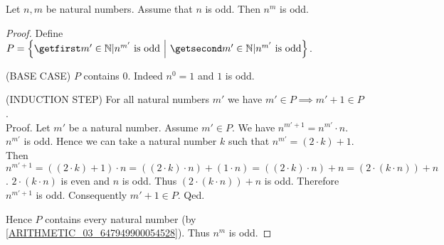 \documentclass[10pt]{article}
\begin{document}
  \begin{forthel}
    \begin{proposition}
      Let $n, m$ be natural numbers.
      Assume that $n$ is odd.
      Then $n^{m}$ is odd.
    \end{proposition}
    \begin{proof}
      Define $P = \class{m' \in \Nat | \text{$n^{m'}$ is odd}}$.

      (BASE CASE) $P$ contains $0$.
      Indeed $n^{0} = 1$ and $1$ is odd.

      (INDUCTION STEP) For all natural numbers $m'$ we have $m' \in P \implies m' + 1 \in P$. \\
      Proof.
        Let $m'$ be a natural number.
        Assume $m' \in P$.
        We have $n^{m' + 1} = n^{m'} \cdot n$.
        $n^{m'}$ is odd.
        Hence we can take a natural number $k$ such that $n^{m'} = (2 \cdot k) + 1$.
        Then $n^{m' + 1} =
        ((2 \cdot k) + 1) \cdot n =
        ((2 \cdot k) \cdot n) + (1 \cdot n) =
        ((2 \cdot k) \cdot n) + n =
        (2 \cdot (k \cdot n)) + n$.
        $2 \cdot (k \cdot n)$ is even and $n$ is odd.
        Thus $(2 \cdot (k \cdot n)) + n$ is odd.
        Therefore $n^{m' + 1}$ is odd.
        Consequently $m' + 1 \in P$.
      Qed.

      Hence $P$ contains every natural number (by \cref{ARITHMETIC_03_647949900054528}).
      Thus $n^{m}$ is odd.
    \end{proof}
  \end{forthel}
\end{document}
